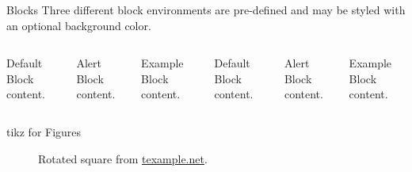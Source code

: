 \begin{frame}{Blocks}
  Three different block environments are pre-defined and may be styled with an
  optional background color.

  \begin{columns}[T,onlytextwidth]
      \begin{block}{Default}
        Block content.
      \end{block}

      \begin{alertblock}{Alert}
        Block content.
      \end{alertblock}

      \begin{exampleblock}{Example}
        Block content.
      \end{exampleblock}



      \begin{block}{Default}
        Block content.
      \end{block}

      \begin{alertblock}{Alert}
        Block content.
      \end{alertblock}

      \begin{exampleblock}{Example}
        Block content.
      \end{exampleblock}

  \end{columns}
\end{frame}

\begin{frame}{tikz for Figures}
  \begin{figure}
    \setcounter{density}{20}
    \caption{Rotated square from
    \href{http://www.texample.net/tikz/examples/rotated-polygons/}{texample.net}.}
  \end{figure}
\end{frame}

